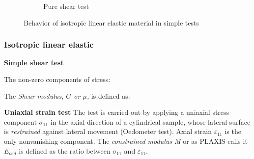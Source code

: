 \documentclass[notes]{beamer}
\begin{document}
\begin{frame}
\begin{figure}[t!]
\begin{subfigure}[t]{0.5\textwidth}
			\caption{Pure shear test}
		\end{subfigure}
		\caption{Behavior of isotropic linear elastic material in simple tests}
\end{figure}
\end{frame}

\begin{frame}
\frametitle{Isotropic linear elastic}
\textbf{Simple shear test}

The non-zero components of stress: 

The \textit{Shear modulus, $G$ or $\mu$,}  is defined as: 

\textbf{Uniaxial strain test}
The test is carried out by applying a uniaxial stress component $\sigma_{11}$ in the axial direction of a cylindrical sample, whose lateral surface is \textit{restrained} against lateral movement (Oedometer test). Axial strain $\varepsilon_{11}$ is the only nonvanishing component. The \textit{constrained modulus M} or as PLAXIS calls it $E_{oed}$ is defined as the ratio between $\sigma_{11}$ and $\varepsilon_11$.

\end{frame}
\end{document}
